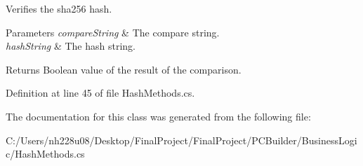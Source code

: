 Verifies the sha256 hash. 


\begin{DoxyParams}{Parameters}
{\em compare\+String} & The compare string.\\
\hline
{\em hash\+String} & The hash string.\\
\hline
\end{DoxyParams}
\begin{DoxyReturn}{Returns}
Boolean value of the result of the comparison.
\end{DoxyReturn}


Definition at line 45 of file Hash\+Methods.\+cs.



The documentation for this class was generated from the following file\+:\begin{DoxyCompactItemize}
\item 
C\+:/\+Users/nh228u08/\+Desktop/\+Final\+Project/\+Final\+Project/\+P\+C\+Builder/\+Business\+Logic/Hash\+Methods.\+cs\end{DoxyCompactItemize}
